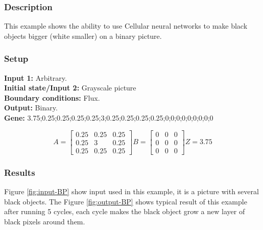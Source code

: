 \subsubsection{Description}
This example shows the ability to use Cellular neural networks to make black objects bigger (white smaller) on a binary picture. 
\subsubsection{Setup}

\textbf{Input 1:} Arbitrary.\\
\textbf{Initial state/Input 2:} Grayscale picture\\
\textbf{Boundary conditions:} Flux.\\
\textbf{Output:} Binary.\\
\textbf{Gene:} 3.75;0.25;0.25;0.25;0.25;3;0.25;0.25;0.25;0.25;0;0;0;0;0;0;0;0;0\\

\begin{minipage}{0.9\linewidth}
\begin{equation}
A =
\begin{bmatrix}
 0.25 &  0.25 &  0.25 \\
  0.25 &  3 &  0.25 \\
  0.25 &  0.25 &  0.25
\end{bmatrix}
B =
\begin{bmatrix}
 0 & 0 & 0 \\
 0 & 0 & 0 \\
 0 & 0 & 0
\end{bmatrix}
Z = 3.75
\end{equation}
\end{minipage}

\subsubsection{Results}
Figure \ref{fig:input-BP} show input used in this example, it is a picture with several black objects. The Figure \ref{fig:output-BP} shows typical result of this example after running 5 cycles, each cycle makes the black object grow a new layer of black pixels around them. \\

